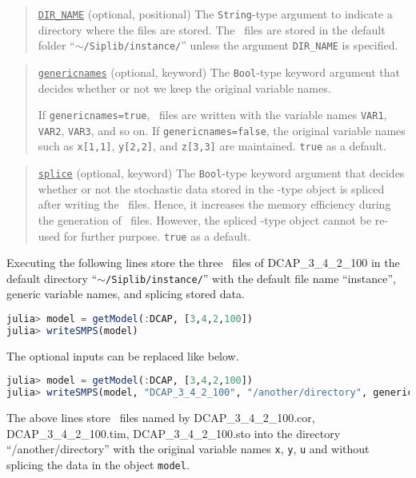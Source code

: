 \begin{quote}
	\noindent\underline{\texttt{DIR\_NAME}} (optional, positional) The \texttt{String}-type argument to indicate a directory where the files are stored. The \smps\ files are stored in the default folder ``\texttt{$\sim$/Siplib/instance/}'' unless the argument \texttt{DIR\_NAME} is specified.
\end{quote}

\begin{quote}
	\noindent\underline{\texttt{genericnames}} (optional, keyword) The \texttt{Bool}-type keyword argument that decides whether or not we keep the original variable names. 
	
	If \texttt{genericnames=true}, \smps\ files are written with the variable names \texttt{VAR1}, \texttt{VAR2}, \texttt{VAR3}, and so on. If \texttt{genericnames=false}, the original variable names such as \texttt{x[1,1]}, \texttt{y[2,2]}, and \texttt{z[3,3]} are maintained. \texttt{true} as a default.
\end{quote}

\begin{quote}
	\noindent\underline{\texttt{splice}} (optional, keyword) The \texttt{Bool}-type keyword argument that decides whether or not the stochastic data stored in the \jumpmodel-type object is spliced after writing the \smps\ files. Hence, it increases the memory efficiency during the generation of \smps\ files. However, the spliced \jumpmodel-type object cannot be re-used for further purpose. \texttt{true} as a default.
\end{quote}

Executing the following lines store the three \smps\ files of DCAP\_3\_4\_2\_100 in the default directory ``\texttt{$\sim$/Siplib/instance/}''  with the default file name ``instance'', generic variable names, and splicing stored data.
\begin{lstlisting}[frame=single,language=julia]
julia> model = getModel(:DCAP, [3,4,2,100])
julia> writeSMPS(model)
\end{lstlisting}
The optional inputs can be replaced like below.
\begin{lstlisting}[frame=single,language=julia]
julia> model = getModel(:DCAP, [3,4,2,100])
julia> writeSMPS(model, "DCAP_3_4_2_100", "/another/directory", genericnames=false, splice=false)
\end{lstlisting}
The above lines store \smps\ files named by DCAP\_3\_4\_2\_100.cor, DCAP\_3\_4\_2\_100.tim, DCAP\_3\_4\_2\_100.sto into the directory ``/another/directory'' with the original variable names \texttt{x}, \texttt{y}, \texttt{u} and without splicing the data in the object \texttt{model}.



